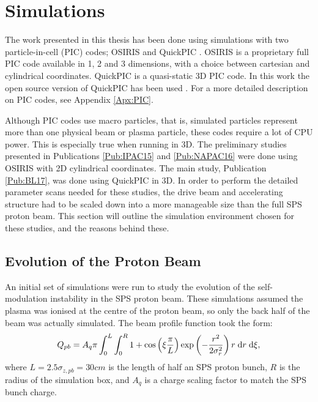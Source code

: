 %
%

\chapter{Simulations}
\label{Ch:Sim}

The work presented in this thesis has been done using simulations with two particle-in-cell (PIC) codes; OSIRIS \cite{fonseca:2002} and QuickPIC \cite{an:2013, huang:2006}. OSIRIS is a proprietary full PIC code available in 1, 2 and 3 dimensions, with a choice between cartesian and cylindrical coordinates. QuickPIC is a quasi-static 3D PIC code. In this work the open source version of QuickPIC has been used \cite{add:quickpic:web}. For a more detailed description on PIC codes, see Appendix \ref{Apx:PIC}.

Although PIC codes use macro particles, that is, simulated particles represent more than one physical beam or plasma particle, these codes require a lot of CPU power. This is especially true when running in 3D. The preliminary studies presented in Publications \ref{Pub:IPAC15} and \ref{Pub:NAPAC16} were done using OSIRIS with 2D cylindrical coordinates. The main study, Publication \ref{Pub:BL17}, was done using QuickPIC in 3D. In order to perform the detailed parameter scans needed for these studies, the drive beam and accelerating structure had to be scaled down into a more manageable size than the full SPS proton beam. This section will outline the simulation environment chosen for these studies, and the reasons behind these.

\section{Evolution of the Proton Beam}
\label{Sim:PBeam}

An initial set of simulations were run to study the evolution of the self-modulation instability in the SPS proton beam. These simulations assumed the plasma was ionised at the centre of the proton beam, so only the back half of the beam was actually simulated. The beam profile function took the form:
\begin{equation}
    Q_{pb} = A_{q}\pi \int_{0}^{L} \int_{0}^{R} 1 + \cos\left(\xi\frac{\pi}{L}\right) \exp\left(-\frac{r^{2}}{2\sigma_{r}^{2}}\right) r \;\mathrm{d}r\;\mathrm{d}\xi, \label{EQ:SPS-Profile}
\end{equation}
where $L = 2.5\sigma_{z,pb} = 30\unit{cm}$ is the length of half an SPS proton bunch, $R$ is the radius of the simulation box, and $A_{q}$ is a charge scaling factor to match the SPS bunch charge.

